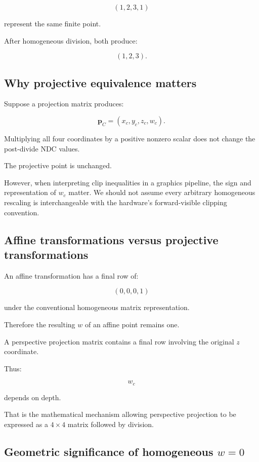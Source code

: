 \[
 (1,2,3,1)
\]

represent the same finite point.

After homogeneous division, both produce:

\[
 (1,2,3).
\]

\subsection{Why projective equivalence matters}\label{02-foundations-ii-ch033-why-projective-equivalence-matters}

Suppose a projection matrix produces:

\[
 \mathbf p_C=(x_c,y_c,z_c,w_c).
\]

Multiplying all four coordinates by a positive nonzero scalar does not change the post-divide NDC values.

The projective point is unchanged.

However, when interpreting clip inequalities in a graphics pipeline, the sign and representation of \(w_c\) matter. We should not assume every arbitrary homogeneous rescaling is interchangeable with the hardware's forward-visible clipping convention.

\subsection{Affine transformations versus projective transformations}\label{02-foundations-ii-ch033-affine-transformations-versus-projective-transformations}

An affine transformation has a final row of:

\[
 (0,0,0,1)
\]

under the conventional homogeneous matrix representation.

Therefore the resulting \(w\) of an affine point remains one.

A perspective projection matrix contains a final row involving the original \(z\) coordinate.

Thus:

\[
 w_c
\]

depends on depth.

That is the mathematical mechanism allowing perspective projection to be expressed as a \(4\times4\) matrix followed by division.

\subsection{\texorpdfstring{Geometric significance of homogeneous \(w=0\)}{Geometric significance of homogeneous w=0}}\label{02-foundations-ii-ch033-geometric-significance-of-homogeneous-w0}

